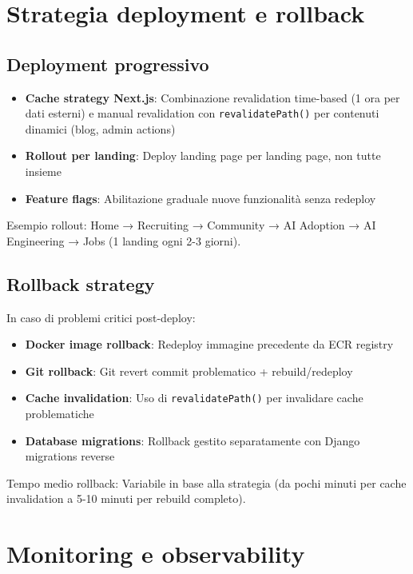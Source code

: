 \section{Strategia deployment e rollback}

\subsection{Deployment progressivo}
\begin{itemize}
  \item \textbf{Cache strategy Next.js}: Combinazione revalidation time-based (1 ora per dati esterni) e manual revalidation con \texttt{revalidatePath()} per contenuti dinamici (blog, admin actions)
  \item \textbf{Rollout per landing}: Deploy landing page per landing page, non tutte insieme
  \item \textbf{Feature flags}: Abilitazione graduale nuove funzionalità senza redeploy
\end{itemize}

Esempio rollout: Home → Recruiting → Community → AI Adoption → AI Engineering → Jobs (1 landing ogni 2-3 giorni).

\subsection{Rollback strategy}
In caso di problemi critici post-deploy:

\begin{itemize}
  \item \textbf{Docker image rollback}: Redeploy immagine precedente da ECR registry
  \item \textbf{Git rollback}: Git revert commit problematico + rebuild/redeploy
  \item \textbf{Cache invalidation}: Uso di \texttt{revalidatePath()} per invalidare cache problematiche
  \item \textbf{Database migrations}: Rollback gestito separatamente con Django migrations reverse
\end{itemize}

Tempo medio rollback: Variabile in base alla strategia (da pochi minuti per cache invalidation a 5-10 minuti per rebuild completo).

\section{Monitoring e observability}

